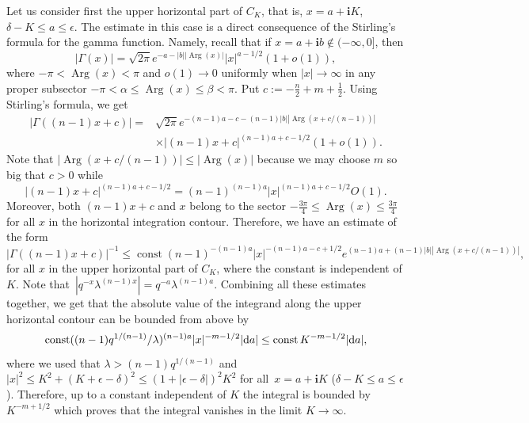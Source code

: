 \documentclass[pdftex]{sigma}
\numberwithin{equation}{section}
\newcommand{\ii}{\mathbf{i}}
\begin{document}
Let us consider first the upper horizontal part of $C_K$, that is, $x=a + \ii K$, $\delta-K\leq a \leq \epsilon$. The estimate in this case is a direct consequence of the Stirling's formula for the gamma function. Namely, recall that if $x=a+\ii b\notin (-\infty, 0]$, then
\[
|\Gamma(x)|=
\sqrt{2\pi}
e^{-a-|b| |{\operatorname{Arg}}(x)|}|x|^{a-1/2}(1+o(1)),
\]
where $-\pi< \operatorname{Arg}(x)<\pi$ and $o(1)\to 0$ uniformly when $|x|\to \infty$ in any proper subsector $-\pi<\alpha\leq \operatorname{Arg}(x)\leq \beta<\pi$.
Put $c:=-\tfrac{n}{2} + m +\tfrac{1}{2}$. Using Stirling's formula, we get
\begin{align*}
|\Gamma((n-1)x+c)|={}& \sqrt{2\pi}
e^{-(n-1) a -c -(n-1) |b| |{\operatorname{Arg}}(x+c/(n-1))|}\\
&\times
|(n-1)x+c|^{(n-1)a+c-1/2}(1+o(1)).
\end{align*}
Note that $|{\operatorname{Arg}}(x+c/(n-1))|\leq |{\operatorname{Arg}}(x)|$ because we may choose $m$ so big that $c>0$ while
\[
|(n-1)x+c|^{(n-1)a+c-1/2}= (n-1)^{(n-1) a}
|x|^{(n-1) a + c-1/2} O(1).
\]
Moreover, both $(n-1)x+c$ and $x$ belong to the sector $-\frac{3\pi}{4}\leq \operatorname{Arg}(x)\leq \frac{3\pi}{4}$ for all $x$ in the horizontal integration contour. Therefore, we have an estimate of the form
\[
|\Gamma((n-1)x+c)|^{-1}\leq \operatorname{const}
(n-1)^{-(n-1) a}
|x|^{-(n-1) a - c+1/2}
e^{(n-1) a +(n-1) |b| |{\operatorname{Arg}}(x+c/(n-1))|},
\]
for all $x$ in the upper horizontal part of $C_K$, where the constant is independent of $K$.
Note that~${|q^{-x} \lambda^{(n-1)x}|=q^{-a} \lambda^{(n-1)a}}$. Combining all these estimates together, we get that the absolute value of the integrand along the upper horizontal contour can be bounded from above by
\[
\operatorname{const}
((n-1)q^{1/(n-1)} /\lambda)^{(n-1) a}
|x|^{-m-1/2} |{\rm d}a|\leq
\operatorname{const}
K^{-m-1/2} |{\rm d}a|,
\]
where we used that $\lambda>(n-1) q^{1/(n-1)}$ and $|x|^2\leq K^2+(K+\epsilon-\delta)^2\leq (1+|\epsilon-\delta|)^2 K^2$ for all~${x=a+\ii K}$ ($\delta-K\leq a\leq \epsilon$). Therefore, up to a constant independent of $K$ the integral is bounded by $K^{-m+1/2}$ which proves that the integral vanishes in the limit $K\to \infty$.
\end{document}
